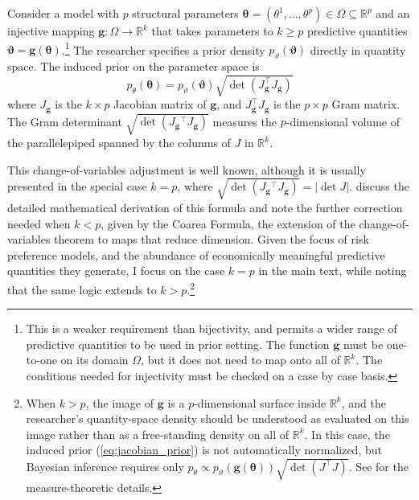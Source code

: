 \documentclass[12pt,a4paper]{article}
\theoremstyle{definition}
\theoremstyle{remark}
\newcommand{\R}{\mathbb{R}}
\newcommand{\bth}{\boldsymbol{\theta}}
\newcommand{\bv}{\boldsymbol{\vartheta}}
\newcommand{\bg}{\mathbf{g}}
\begin{document}
Consider a model with $p$ structural parameters $\bth =
(\theta^1, \ldots, \theta^p) \in \Omega \subseteq \R^p$ and an
injective mapping $\bg: \Omega \to \R^k$ that takes parameters
to $k \geq p$ predictive quantities $\bv{} = \bg(\bth)$.\footnote{
  This is a weaker requirement than bijectivity, and permits a wider range of
  predictive quantities to be used in prior setting. The function $\bg$
  must be one-to-one on its domain $\Omega$, but it does not need to map onto
  all of $\R^k$. The conditions needed for injectivity must be checked
  on a case by case basis.
}
The researcher specifies a prior density $p_{\vartheta}(\bv{})$ directly in
quantity space. The induced prior on the parameter space is
\begin{equation}
  \label{eq:jacobian_prior}
  p_\theta(\bth) = p_{\vartheta}\!\left(\bv{}\right) \sqrt{\det\!\left(J_{\bg}^\top J_{\bg}\right)}
\end{equation}
where $J_{\bg}$ is the $k \times p$ Jacobian matrix of $\bg{}$, and $J_{\bg}^\top
J_{\bg}$ is the $p \times p$ Gram matrix. The Gram determinant
$\sqrt{\det(J_\bg{}^\top J_\bg{})}$ measures the $p$-dimensional volume of the
parallelepiped spanned by the columns of $J$ in $\R^k$.

This change-of-variables adjustment is well known, although it is usually
presented in the special case $k = p$, where
$\sqrt{\det(J_\bg{}^\top J_\bg{})} = |\det J|$. \textcite[108-110]{Segert2019}
discuss the detailed mathematical derivation of this formula and note the
further correction needed when $k < p$, given by the Coarea Formula, the
extension of the change-of-variables theorem to maps that reduce dimension. Given the focus of
risk preference models, and the abundance of economically meaningful predictive
quantities they generate, I focus on the case $k = p$ in the main text, while
noting that the same logic extends to $k > p$.\footnote{
  When $k > p$, the image of $\bg$ is a $p$-dimensional surface inside $\R^k$,
  and the researcher's quantity-space density should be understood as evaluated
  on this image rather than as a free-standing density on all of $\R^k$. In
  this case, the induced prior (\ref{eq:jacobian_prior}) is not automatically
  normalized, but Bayesian inference requires only $p_\theta \propto
  p_\vartheta(\bg(\bth))\sqrt{\det(J^\top J)}$. See
  \textcite[108-110]{Segert2019} for the measure-theoretic details.
}
\end{document}
